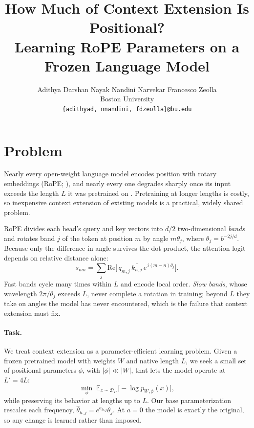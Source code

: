 \documentclass[11pt]{article}
\title{How Much of Context Extension Is Positional?\\Learning RoPE Parameters on a Frozen Language Model}
\author{Adithya Darshan Nayak \quad Nandini Narvekar \quad Francesco Zeolla \\
  Boston University \\
  \texttt{\{adithyad, nnandini, fdzeolla\}@bu.edu}}
\begin{document}
\maketitle

\section{Problem}

Nearly every open-weight language model encodes position with rotary embeddings (RoPE; \citealp{su2021roformer}), and nearly every one degrades sharply once its input exceeds the length $L$ it was pretrained on \citep{chen2023pi, peng2024yarn}. Pretraining at longer lengths is costly, so inexpensive context extension of existing models is a practical, widely shared problem.

\smallskip
RoPE divides each head's query and key vectors into $d/2$ two-dimensional \emph{bands} and rotates band $j$ of the token at position $m$ by angle $m\theta_j$, where $\theta_j = b^{-2j/d}$. Because only the difference in angle survives the dot product, the attention logit depends on relative distance alone:
\begin{equation}
s_{mn} = \textstyle\sum_{j} \mathrm{Re}\big[\,q_{m,j}\,\overline{k_{n,j}}\,e^{\,i(m-n)\theta_j}\big].
\end{equation}
Fast bands cycle many times within $L$ and encode local order. \emph{Slow bands}, whose wavelength $2\pi/\theta_j$ exceeds $L$, never complete a rotation in training; beyond $L$ they take on angles the model has never encountered, which is the failure that context extension must fix.

\paragraph{Task.} We treat context extension as a parameter-efficient learning problem. Given a frozen pretrained model with weights $W$ and native length $L$, we seek a small set of positional parameters $\phi$, with $|\phi| \ll |W|$, that lets the model operate at $L' = 4L$:
\begin{equation}
\min_{\phi}\; \mathbb{E}_{x\sim\mathcal{D}_{L'}}\big[-\log p_{W,\phi}(x)\big],
\end{equation}
while preserving its behavior at lengths up to $L$. Our base parameterization rescales each frequency, $\hat\theta_{h,j} = e^{a_{h,j}}\theta_j$. At $a=0$ the model is exactly the original, so any change is learned rather than imposed.
\end{document}
